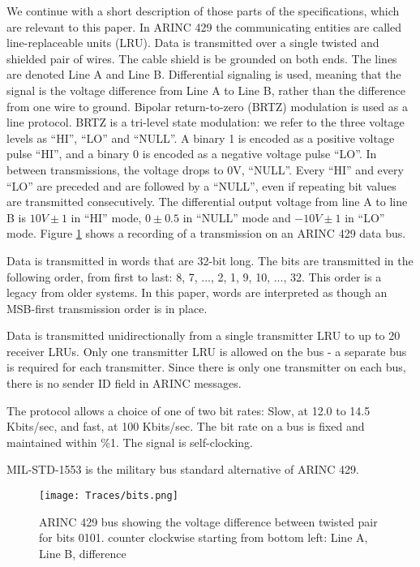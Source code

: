 \documentclass[conference]{IEEEtran}
\begin{document}
  We continue with a short description of those parts of the specifications, which are relevant to this paper. In ARINC 429 the communicating entities are called line-replaceable units (LRU). Data is transmitted over a single twisted and shielded pair of wires. The cable shield is be grounded on both ends. The lines are denoted Line A and Line B. Differential signaling is used, meaning that the signal is the voltage difference from Line A to Line B, rather than the difference from one wire to ground. Bipolar return-to-zero (BRTZ) modulation is used as a line protocol. BRTZ is a tri-level state modulation: we refer to the three voltage levels as ``HI'', ``LO'' and ``NULL''. A binary 1 is encoded as a positive voltage pulse ``HI'', and a binary 0 is encoded as a negative voltage pulse ``LO''. In between transmissions, the voltage drops to 0V, ``NULL''. Every ``HI'' and every ``LO'' are preceded and are followed by a ``NULL'', even if repeating bit values are transmitted consecutively. The differential output voltage from line A to line B is $10V \pm 1$ in ``HI'' mode, $0 \pm 0.5$ in ``NULL'' mode and $-10V \pm 1$ in ``LO'' mode.  Figure \ref{fig:word_example} shows a recording of a transmission on an ARINC 429 data bus.
  
  Data is transmitted in words that are 32-bit long. The bits are transmitted in the following order, from first to last: 8, 7, ..., 2, 1, 9, 10, ..., 32. This order is a legacy from older systems. In this paper, words are interpreted as though an MSB-first transmission order is in place.
  
  Data is transmitted unidirectionally from a single transmitter LRU to up to 20 receiver LRUs. Only one transmitter LRU is allowed on the bus - a separate bus is required for each transmitter. Since there is only one transmitter on each bus, there is no sender ID field in ARINC messages.
   
  The protocol allows a choice of one of two bit rates: Slow, at 12.0 to 14.5 Kbits/sec, and fast, at 100 Kbits/sec. The bit rate on a bus is fixed and maintained within \%1. The signal is self-clocking.
  
  MIL-STD-1553 \cite{united1986milstd1553} is the military bus standard alternative of ARINC 429.
  
  \begin{figure}[t]
    \centering
    \texttt{[image: Traces/bits.png]}
    \caption{ARINC 429 bus showing the voltage difference between twisted pair for bits 0101. counter clockwise starting from bottom left: Line A, Line B, difference}
    \label{fig:word_example}
  \end{figure}
  
\end{document}
